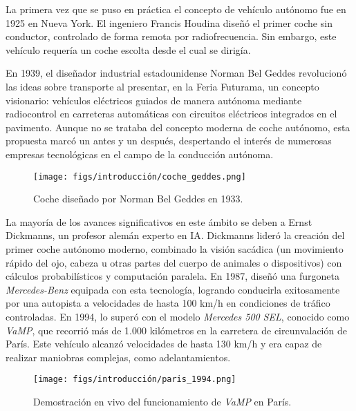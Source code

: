La primera vez que se puso en práctica el concepto de vehículo autónomo fue en 1925 en Nueva York. El ingeniero Francis Houdina diseñó el primer coche sin conductor, controlado de forma remota por radiofrecuencia. Sin embargo, este vehículo requería un coche escolta desde el cual se dirigía.

En 1939, el diseñador industrial estadounidense Norman Bel Geddes revolucionó las ideas sobre transporte al presentar, en la Feria Futurama, un concepto visionario: vehículos eléctricos guiados de manera autónoma mediante radiocontrol en carreteras automáticas con circuitos eléctricos integrados en el pavimento. Aunque no se trataba del concepto moderna de coche autónomo, esta propuesta marcó un antes y un después, despertando el interés de numerosas empresas tecnológicas en el campo de la conducción autónoma.

\begin{figure} [ht]
  \begin{center}
    \texttt{[image: figs/introducción/coche\_geddes.png]}
  \end{center}
  \caption{Coche diseñado por Norman Bel Geddes en 1933.}
  \label{coche-geddes}
  \end{figure}

La mayoría de los avances significativos en este ámbito se deben a Ernst Dickmanns, un profesor alemán experto en \ac{IA}. Dickmanns lideró la creación del primer coche autónomo moderno, combinado la visión sacádica (un movimiento
rápido del ojo, cabeza u otras partes del cuerpo de animales o dispositivos) con cálculos probabilísticos y computación paralela. En 1987, diseñó una furgoneta \textit{Mercedes-Benz} equipada con esta tecnología, logrando conducirla exitosamente por una autopista a velocidades de hasta 100 km/h en condiciones de tráfico controladas. En 1994, lo superó con el modelo  \textit{Mercedes 500 SEL}, conocido como \textit{VaMP}, que recorrió más de 1.000 kilómetros en la carretera de circunvalación de París. Este vehículo alcanzó velocidades de hasta 130 km/h y era capaz de realizar maniobras complejas, como adelantamientos.

\begin{figure}[ht]
  \begin{center}
    \texttt{[image: figs/introducción/paris\_1994.png]}
  \end{center}
  \caption{Demostración en vivo del funcionamiento de \textit{VaMP} en París.}
  \label{coche-geddes}
\end{figure}

